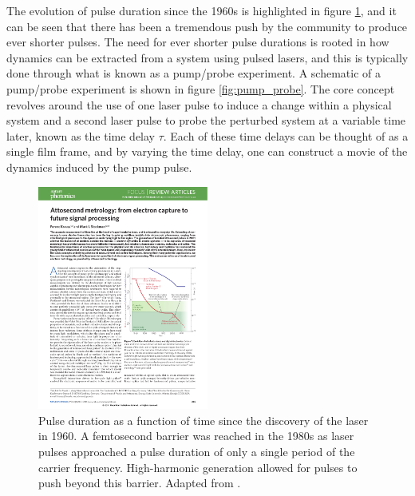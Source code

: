 The evolution of pulse duration since the 1960s is highlighted in figure \ref{fig:Pulse_duration}, and it can be seen that there has been a tremendous push by the community to produce ever shorter pulses.  The need for ever shorter pulse durations is rooted in how dynamics can be extracted from a system using pulsed lasers, and this is typically done through what is known as a pump/probe experiment. A schematic of a pump/probe experiment is shown in figure \ref{fig:pump_probe}.  The core concept revolves around the use of one laser pulse to induce a change within a physical system and a second laser pulse to probe the perturbed system at a variable time later, known as the time delay $\tau$.  Each of these time delays can be thought of as a single film frame, and by varying the time delay, one can construct a movie of the dynamics induced by the pump pulse.  

\begin{figure}
	\centering
	\includegraphics[width=0.5\textwidth]{figures/Introduction/Pulse_duration.pdf}
	\caption[Pulse duration as a function of time since the 1960s]{Pulse duration as a function of time since the discovery of the laser in 1960.  A femtosecond barrier was reached in the 1980s as laser pulses approached a pulse duration of only a single period of the carrier frequency.  High-harmonic generation allowed for pulses to push beyond this barrier.  Adapted from \cite{krauszAttosecondMetrologyElectron2014}.}
	\label{fig:Pulse_duration}
\end{figure}

